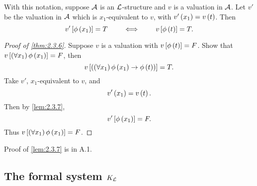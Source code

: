 \begin{lemma}
\label{lem:2.3.7}
With this notation, suppose $ \AA $ is an $ \LL $-structure and $ v $ is a valuation in $ \AA $. Let $ v' $ be the valuation in $ \AA $ which is $ x_1 $-equivalent to $ v $, with $ v'\rb{x_1} = v\rb{t} $. Then
$$ v'\sb{\phi\rb{x_1}} = T \qquad \iff \qquad v\sb{\phi\rb{t}} = T. $$
\end{lemma}

\begin{proof}[Proof of \ref{thm:2.3.6}]
Suppose $ v $ is a valuation with $ v\sb{\phi\rb{t}} = F $. Show that $ v\sb{\fab{x_1}\phi\rb{x_1}} = F $, then
$$ v\sb{\impb{\fab{x_1}\phi\rb{x_1}}{\phi\rb{t}}} = T. $$
Take $ v' $, $ x_1 $-equivalent to $ v $, and
$$ v'\rb{x_1} = v\rb{t}. $$
Then by \ref{lem:2.3.7},
$$ v'\sb{\phi\rb{x_1}} = F. $$
Thus $ v\sb{\fab{x_1}\phi\rb{x_1}} = F $.
\end{proof}

Proof of \ref{lem:2.3.7} is in A.1.

\subsection{The formal system $ K_{\LL} $}

